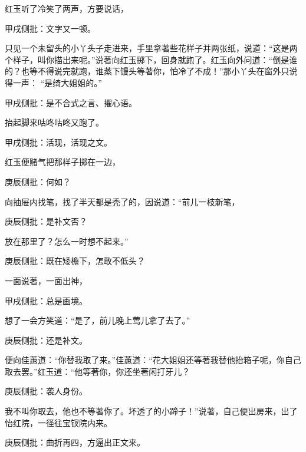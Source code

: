 \begin{parag}


    红玉听了冷笑了两声，方要说话，\begin{note}甲戌侧批：文字又一顿。\end{note}只见一个未留头的小丫头子走进来，手里拿著些花样子并两张纸，说道：“这是两个样子，叫你描出来呢。”说著向红玉掷下，回身就跑了。红玉向外问道：“倒是谁的？也等不得说完就跑，谁蒸下馒头等著你，怕冷了不成！”那小丫头在窗外只说得一声： “是绮大姐姐的。”\begin{note}甲戌侧批：是不合式之言、擢心语。\end{note}抬起脚来咕咚咕咚又跑了。\begin{note}甲戌侧批：活现，活现之文。\end{note}红玉便赌气把那样子掷在一边，\begin{note}庚辰侧批：何如？\end{note}向抽屉内找笔，找了半天都是秃了的，因说道：“前儿一枝新笔，\begin{note}庚辰侧批：是补文否？\end{note}放在那里了？怎么一时想不起来。”\begin{note}庚辰侧批：既在矮檐下，怎敢不低头？\end{note}一面说著，一面出神，\begin{note}甲戌侧批：总是画境。\end{note}想了一会方笑道：“是了，前儿晚上莺儿拿了去了。”\begin{note}庚辰侧批：还是补文。\end{note}便向佳蕙道：“你替我取了来。”佳蕙道：“花大姐姐还等著我替他抬箱子呢，你自己取去罢。”红玉道：“他等著你，你还坐著闲打牙儿？\begin{note}庚辰侧批：袭人身份。\end{note}我不叫你取去，他也不等著你了。坏透了的小蹄子！”说著，自己便出房来，出了怡红院，一径往宝钗院内来。\begin{note}庚辰侧批：曲折再四，方逼出正文来。\end{note}
\end{parag}


